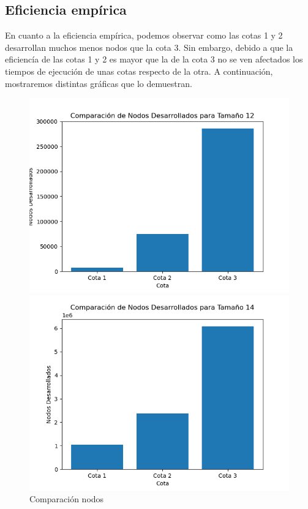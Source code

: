 \documentclass[11pt,openany]{book}
\begin{document}
\subsection{Eficiencia empírica}
En cuanto a la eficiencia empírica, podemos observar como las cotas 1 y 2 desarrollan muchos menos nodos que la cota 3. Sin embargo,
debido a que la eficiencía de las cotas 1 y 2 es mayor que la de la cota 3 no se ven afectados los tiempos de ejecución de unas cotas
respecto de la otra. A continuación, mostraremos distintas gráficas que lo demuestran.

\begin{figure}[H]
      \centering
      \begin{minipage}{.48\textwidth}
            \centering
            \includegraphics[width=1\linewidth]{assets/Img/comparacion_nodos_12.png}
            \caption{Comparación nodos}
            \label{fig:Comparacion nodos}
      \end{minipage}%
      \begin{minipage}{.48\textwidth}
            \centering
            \includegraphics[width=1\linewidth]{assets/Img/comparacion_nodos_14.png}

\end{minipage}
\end{figure}
\end{document}
